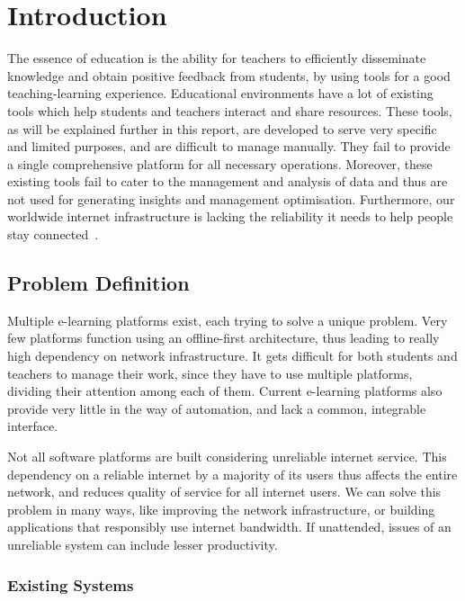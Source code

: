 \chapter{Introduction}


The essence of education is the ability for teachers to efficiently 
disseminate knowledge and obtain positive feedback from students, by 
using tools for a good teaching-learning experience. 
Educational environments have a lot of existing tools which help students 
and teachers interact and share resources. These tools, as will be explained 
further in this report, are developed to serve very specific and limited 
purposes, and are difficult to manage manually. They fail to provide a 
single comprehensive platform for all necessary operations. 
Moreover, these existing tools fail to cater to the management and analysis 
of data and thus are not used for generating insights and management optimisation. 
Furthermore, our worldwide internet infrastructure is lacking the reliability it 
needs to help people stay connected~\cite{WebF20}.

\section{Problem Definition}

Multiple e-learning platforms exist, each trying to solve a unique problem. 
Very few platforms function using an offline-first architecture, thus leading to 
really high dependency on network infrastructure. 
It gets difficult for both students and teachers to manage their work, 
since they have to use multiple platforms, dividing their attention among each of them. 
Current e-learning platforms also provide very little in the way of automation, 
and lack a common, integrable interface.

Not all software platforms are built considering unreliable internet service. 
This dependency on a reliable internet by a majority of its users thus affects the entire network, 
and reduces quality of service for all internet users. We can solve this problem in many ways, 
like improving the network infrastructure, or building applications that 
responsibly use internet bandwidth. If unattended, issues of an unreliable 
system can include lesser productivity.

\subsection{Existing Systems}

